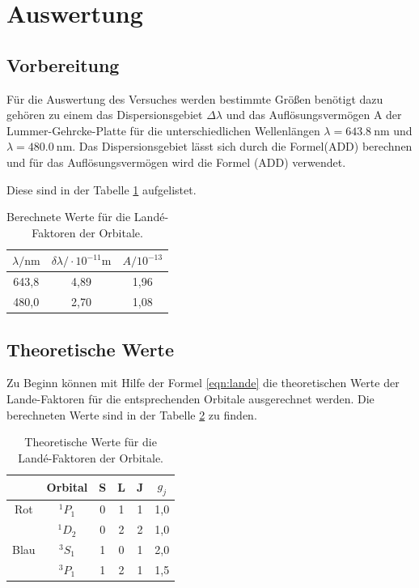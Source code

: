 \section{Auswertung}
\label{sec:Auswertung}
\subsection{Vorbereitung}
Für die Auswertung des Versuches
werden bestimmte Größen benötigt dazu gehören
zu einem das Dispersionsgebiet $\Delta\lambda$
und das Auflösungsvermögen A der Lummer-Gehrcke-Platte
für die unterschiedlichen Wellenlängen $\lambda=\SI{643.8}{\nano\meter}$
und $\lambda=\SI{480.0}{\nano\meter}$.
Das Dispersionsgebiet lässt sich durch die Formel(ADD) berechnen
und für das Auflösungsvermögen wird die Formel (ADD) verwendet.


Diese sind in der Tabelle  \ref{tab:vorbereitung} aufgelistet.
\begin{table}
  \centering
  \caption{Berechnete Werte für die Landé-Faktoren der Orbitale.}
  \label{tab:vorbereitung}
  \begin{tabular}{c c c}
    \toprule
       $\lambda / \si{\nano\meter} $ &  $\delta\lambda/ \cdot10^{-11}\si{\meter}$  & $A / 10^{-13}$\\
     \midrule
    643,8  &  4,89 &  1,96 \\
    480,0  &  2,70 &  1,08 \\
    \bottomrule
  \end{tabular}
\end{table}



\FloatBarrier

\subsection{Theoretische Werte}
Zu Beginn können mit Hilfe der Formel \eqref{eqn:lande}
die theoretischen Werte der Lande-Faktoren
für die entsprechenden Orbitale ausgerechnet werden.
Die berechneten Werte sind in der Tabelle \ref{tab:theo1}
zu finden.

\begin{table}
  \centering
  \caption{Theoretische Werte für die Landé-Faktoren der Orbitale.}
  \label{tab:theo1}
  \begin{tabular}{c c c c c c}
    \toprule
& Orbital  & S   &  L & J  & $g_j$ \\
    \midrule
Rot & $^1P_1$ & 0 & 1 & 1 & 1,0\\
&$^1D_2$& 0 & 2 & 2 & 1,0\\
Blau&$^3S_1$& 1 & 0 & 1 & 2,0\\
&$^3P_1$& 1 & 2 & 1 & 1,5\\
    \bottomrule
  \end{tabular}
\end{table}

